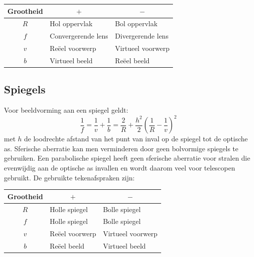 \documentclass[twoside]{report}
\begin{document}
\begin{center}
\begin{tabular}{||c|l|l||}
\hline
{\bf Grootheid}&\multicolumn{1}{c|}{\boldmath$+$}&\multicolumn{1}{c||}{\boldmath$-$}\\
\hline
\hline
$R$&Hol oppervlak&Bol oppervlak\\
$f$&Convergerende lens&Divergerende lens\\
$v$&Re\"eel voorwerp&Virtueel voorwerp\\
$b$&Virtueel beeld&Re\"eel beeld\\
\hline
\end{tabular}
\end{center}

\subsection{Spiegels}
Voor beeldvorming aan een spiegel geldt:
\[
\frac{1}{f}=\frac{1}{v}+\frac{1}{b}=\frac{2}{R}+\frac{h^2}{2}\left(\frac{1}{R}-\frac{1}{v}\right)^2
\]
met $h$ de loodrechte afstand van het punt van inval op de spiegel tot de
optische as. Sferische aberratie kan men verminderen door geen bolvormige
spiegels te gebruiken. Een parabolische spiegel heeft geen sferische aberratie
voor stralen die evenwijdig aan de optische as invallen en wordt daarom veel
voor telescopen gebruikt. De gebruikte tekenafspraken zijn:

\begin{center}
\begin{tabular}{||c|l|l||}
\hline
{\bf Grootheid}&\multicolumn{1}{c|}{\boldmath$+$}&\multicolumn{1}{c||}{\boldmath$-$}\\
\hline
\hline
$R$&Holle spiegel&Bolle spiegel\\
$f$&Holle spiegel&Bolle spiegel\\
$v$&Re\"eel voorwerp&Virtueel voorwerp\\
$b$&Re\"eel beeld&Virtueel beeld\\
\hline
\end{tabular}
\end{center}
\end{document}
